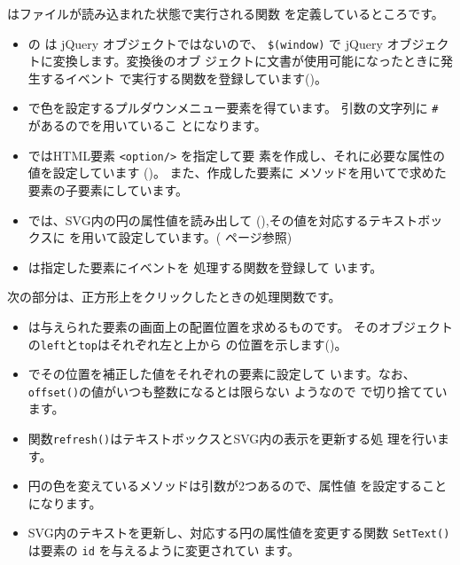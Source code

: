 はファイルが読み込まれた状態で実行される関数
を定義しているところです。
\begin{itemize}\upshape
 \item {}の は jQuery オブジェクトではないので、
			 \verb+$(window)+ で jQuery オブジェクトに変換します。変換後のオブ
			 ジェクトに文書が使用可能になったときに発生するイベント
			 で実行する関数を登録しています()。
 \item {}で色を設定するプルダウンメニュー要素を得ています。
			 引数の文字列に \verb+#+ があるのでを用いているこ
			 とになります。
 \item {}ではHTML要素 \verb+<option/>+ を指定して要
			 素を作成し、それに必要な属性の値を設定しています
			 ()。 また、作成した要素に
			 メソッドを用いてで求めた
			 要素の子要素にしています。
 \item {}では、SVG内の円の属性値を読み出して
			 (),その値を対応するテキストボックスに
			  を用いて設定しています。(\pageref{jQueryMethod}
			 ページ参照)
 \item {}は指定した要素にイベントを
			 処理する関数を登録して
			 います。
\end{itemize}
次の部分は、正方形上をクリックしたときの処理関数です。
\begin{itemize}\upshape
 \item {}は与えられた要素の画面上の配置位置を求めるものです。
			 そのオブジェクトの\texttt{left}と\texttt{top}はそれぞれ左と上から
			 の位置を示します()。
 \item {}でその位置を補正した値をそれぞれの要素に設定して
			 います。なお、\texttt{offset()}の値がいつも整数になるとは限らない
			 ようなので で切り捨てています。
\end{itemize}
\begin{itemize}\upshape
 \item 関数\texttt{refresh()}はテキストボックスとSVG内の表示を更新する処
			 理を行います。
 \item 円の色を変えているメソッドは引数が2つあるので、属性値
			 を設定することになります。
 \item SVG内のテキストを更新し、対応する円の属性値を変更する関数
			 \texttt{SetText()}は要素の \texttt{id} を与えるように変更されてい
			 ます。
\end{itemize}

